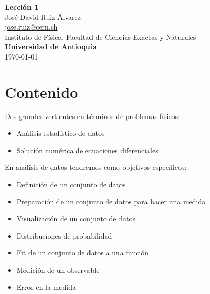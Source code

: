 \documentclass[10.5pt]{article}
\begin{document}
\noindent
\begin{minipage}[b]{0.75\linewidth}
{\LARGE\bf Lecci\'{o}n 1}\\ %
\large{Jos\'{e} David Ruiz \'{A}lvarez} \\
\small{\href{mailto:jose.ruiz@cern.ch}{jose.ruiz@cern.ch}} \\ %
\normalsize{Instituto de Física, Facultad de Ciencias Exactas y Naturales} \\%
\normalsize{\bf Universidad de Antioquia} \\[8mm]
\today %
\end{minipage}%



\section{Contenido}

Dos grandes vertientes en t\'{e}rminos de problemas f\'{i}sicos: 
\begin{itemize}
\item Análisis estadístico de datos
\item Solución numérica de ecuaciones diferenciales
\end{itemize}

En análisis de datos tendremos como objetivos específicos:
\begin{itemize}
\item Definición de un conjunto de datos 
\item Preparación de un conjunto de datos para hacer una medida
\item Visualización de un conjunto de datos
\item Distribuciones de probabilidad
\item Fit de un conjunto de datos a una función
\item Medición de un observable
\item Error en la medida
\end{itemize}
\end{document}
